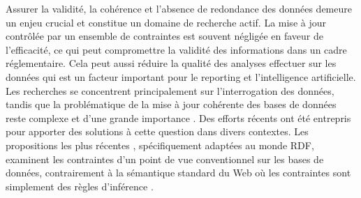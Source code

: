 Assurer la validité, la cohérence et l'absence de redondance des données demeure un enjeu crucial et constitue un domaine de recherche actif.
La mise à jour contrôlée par un ensemble de contraintes est souvent négligée en faveur de l'efficacité, ce qui peut compromettre la validité des informations dans un cadre réglementaire.
Cela peut aussi réduire la qualité des analyses effectuer sur les données qui est un facteur important pour le reporting et l'intelligence artificielle.
Les recherches se concentrent principalement sur l'interrogation des données, tandis que la problématique de la mise à jour cohérente des bases de données reste complexe et d'une grande importance \cite{halfeldferrariUpdateRulesDatalog1998,scheweLimitationsRuleTriggering1998,linkArithmeticTheoryConsistency2002}.
Des efforts récents ont été entrepris pour apporter des solutions à cette question dans divers contextes.
Les propositions les plus récentes \cite{akhtarConstraintsRDF2011,flourisFormalFoundationsRDF2013,halfedferrariRDFUpdatesConstraints2017,halfeld-ferrariUpdatingRDFDatabases2017}, spécifiquement adaptées au monde RDF, examinent les contraintes d'un point de vue conventionnel sur les bases de données, contrairement à la sémantique standard du Web où les contraintes sont simplement des règles d'inférence \cite{lausenSPARQLingConstraintsRDF2008,gottlobOntologicalQueriesRewriting2011,patel-schneiderUsingDescriptionLogics2015}.

